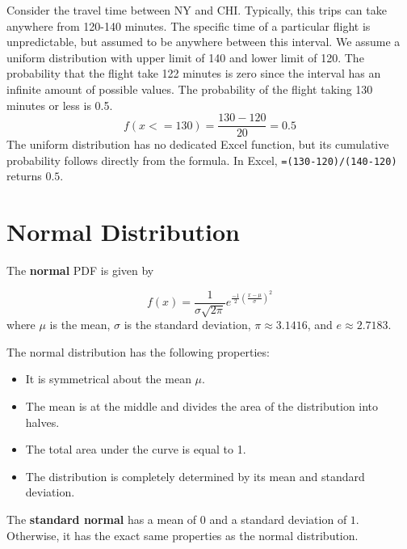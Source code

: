 \documentclass[
  11pt,
  letterpaper,
  DIV=11,
  numbers=noendperiod,
  oneside,
  open=any]{scrreprt}
\begin{document}
\begin{bsexample}[Example]

Consider the travel time between NY and CHI. Typically, this trips can
take anywhere from 120-140 minutes. The specific time of a particular
flight is unpredictable, but assumed to be anywhere between this
interval. We assume a uniform distribution with upper limit of 140 and
lower limit of 120. The probability that the flight take 122 minutes is
zero since the interval has an infinite amount of possible values. The
probability of the flight taking 130 minutes or less is 0.5.
\[f(x<=130)=\frac{130-120}{20}=0.5\] The uniform distribution has no
dedicated Excel function, but its cumulative probability follows
directly from the formula. In Excel, \texttt{=(130-120)/(140-120)}
returns \(0.5\).

\end{bsexample}

\section{Normal Distribution}\label{normal-distribution}

The \textbf{normal} PDF is given by

\begin{bsformula}

\[f(x)= \frac {1}{\sigma \sqrt{2\pi}} e^{\frac {-1}{2} (\frac {x-\mu}{\sigma})^2}\]
where \(\mu\) is the mean, \(\sigma\) is the standard deviation,
\(\pi \approx 3.1416\), and \(e \approx 2.7183\).

\end{bsformula}

The normal distribution has the following properties:

\begin{itemize}
\item
  It is symmetrical about the mean \(\mu\).
\item
  The mean is at the middle and divides the area of the distribution
  into halves.
\item
  The total area under the curve is equal to 1.
\item
  The distribution is completely determined by its mean and standard
  deviation.
\end{itemize}

The \textbf{standard normal} has a mean of \(0\) and a standard
deviation of \(1\). Otherwise, it has the exact same properties as the
normal distribution.
\end{document}
